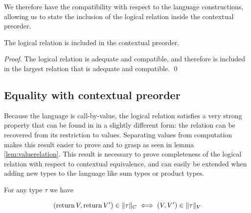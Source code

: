 We therefore have the compatibility with respect to the language constructions, 
allowing us to state the inclusion of the logical relation inside the contextual
preorder.

\begin{atheorem}
    \label{thm:inclusionpreorder}
    The logical relation is included in the contextual preorder.
\end{atheorem}

\begin{proof}
    The logical relation is adequate and compatible, and 
    therefore is included in the largest relation that 
    is adequate and compatible.
\qed\end{proof}

\subsection{Equality with contextual preorder}

Because the language is call-by-value, the logical 
relation satisfies a very strong property that 
can be found in \cite{pitts1998existential} in a slightly different form:
the relation can be recovered from its restriction to values.
Separating values from computation makes this result easier to 
prove and to grasp as seen in lemma \ref{lem:valuerelation}.
This result is necessary to prove completeness of the logical 
relation with respect to contextual equivalence, and can easily 
be extended when adding new types to the language like sum types 
or product types.

\begin{alemma}
    \label{lem:valuerelation}
    For any type $\tau$ we have 

    \begin{equation*}
        (\operatorname{return} V, \operatorname{return} V') \in \| \tau \|_C
        \iff 
        (V,V') \in \| \tau \|_V
    \end{equation*}
\end{alemma}

